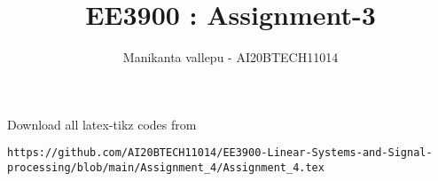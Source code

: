\documentclass[journal,12pt,twocolumn]{IEEEtran}
\DeclareMathOperator*{\Res}{Res}
\begin{document}
\newcommand{\BEQA}{\begin{eqnarray}}
\newcommand{\EEQA}{\end{eqnarray}}
\newcommand{\define}{\stackrel{\triangle}{=}}

\raggedbottom
\setlength{\parindent}{0pt}
\providecommand{\mbf}{\mathbf}
\providecommand{\pr}[1]{\ensuremath{\Pr\left(#1\right)}}
\providecommand{\qfunc}[1]{\ensuremath{Q\left(#1\right)}}
\providecommand{\sbrak}[1]{\ensuremath{{}\left[#1\right]}}
\providecommand{\lsbrak}[1]{\ensuremath{{}\left[#1\right.}}
\providecommand{\rsbrak}[1]{\ensuremath{{}\left.#1\right]}}
\providecommand{\brak}[1]{\ensuremath{\left(#1\right)}}
\providecommand{\lbrak}[1]{\ensuremath{\left(#1\right.}}
\providecommand{\rbrak}[1]{\ensuremath{\left.#1\right)}}
\providecommand{\cbrak}[1]{\ensuremath{\left\{#1\right\}}}
\providecommand{\lcbrak}[1]{\ensuremath{\left\{#1\right.}}
\providecommand{\rcbrak}[1]{\ensuremath{\left.#1\right\}}}
\theoremstyle{remark}
\newtheorem{rem}{Remark}
\newcommand{\sgn}{\mathop{\mathrm{sgn}}}
\providecommand{\abs}[1]{\vert#1\vert}
\providecommand{\res}[1]{\Res\displaylimits_{#1}} 
\providecommand{\norm}[1]{\lVert#1\rVert}
\providecommand{\mtx}[1]{\mathbf{#1}}
\providecommand{\mean}[1]{E[ #1 ]}
\providecommand{\fourier}{\overset{\mathcal{F}}{ \rightleftharpoons}}
\providecommand{\system}{\overset{\mathcal{H}}{ \longleftrightarrow}}
\newcommand{\solution}{\noindent \textbf{Solution: }}
\newcommand{\cosec}{\,\text{cosec}\,}
\providecommand{\dec}[2]{\ensuremath{\overset{#1}{\underset{#2}{\gtrless}}}}
\newcommand{\myvec}[1]{\ensuremath{\begin{pmatrix}#1\end{pmatrix}}}
\newcommand{\mydet}[1]{\ensuremath{\begin{vmatrix}#1\end{vmatrix}}}
\makeatletter
{}
\makeatother
\let\StandardTheFigure\thefigure
\let\vec\mathbf
\renewcommand{\thefigure}{\theproblem}
\def\putbox#1#2#3{\makebox[0in][l]{\makebox[#1][l]{}\raisebox{\baselineskip}[0in][0in]{\raisebox{#2}[0in][0in]{#3}}}}
     \def\rightbox#1{\makebox[0in][r]{#1}}
     \def\centbox#1{\makebox[0in]{#1}}
     \def\topbox#1{\raisebox{-\baselineskip}[0in][0in]{#1}}
     \def\midbox#1{\raisebox{-0.5\baselineskip}[0in][0in]{#1}}
\vspace{3cm}
\title{ EE3900 : Assignment-3}
\author{Manikanta vallepu - AI20BTECH11014}
\maketitle
\newpage
\bigskip
\renewcommand{\thefigure}{\theenumi}
\renewcommand{\thetable}{\theenumi}
\newcommand{\R}{\mathbb{R}}
Download all  latex-tikz codes from 
\begin{lstlisting}
https://github.com/AI20BTECH11014/EE3900-Linear-Systems-and-Signal-processing/blob/main/Assignment_4/Assignment_4.tex
\end{lstlisting}
\vspace{0.5cm}
\end{document}
